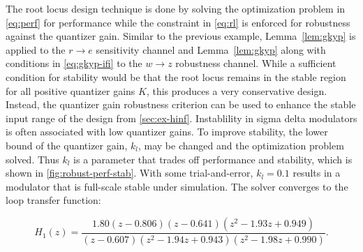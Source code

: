The root locus design technique is done by solving the optimization problem in \autoref{eq:perf} for performance while the constraint in \autoref{eq:rl} is enforced for robustness against the quantizer gain. Similar to the previous example, Lemma~\ref{lem:gkyp} is applied to the $r \rightarrow e$ sensitivity channel and Lemma~\ref{lem:gkyp} along with conditions in \autoref{eq:gkyp-ifi} to the $w \rightarrow z$ robustness channel. While a sufficient condition for stability would be that the root locus remains in the stable region for all positive quantizer gains $K$, this produces a very conservative design. Instead, the quantizer gain robustness criterion can be used to enhance the stable input range of the design from \autoref{sec:ex-hinf}. Instablility in sigma delta modulators is often associated with low quantizer gains. To improve stability, the lower bound of the quantizer gain, $k_l$, may be changed and the optimization problem solved. Thus $k_l$ is a parameter that trades off performance and stability, which is shown in \autoref{fig:robust-perf-stab}. With some trial-and-error, $k_l=0.1$ results in a modulator that is full-scale stable under simulation. The solver converges to the loop transfer function:

\begin{equation*}
	H_1(z) = \frac{1.80\left(z - 0.806\right)\left(z - 0.641\right)\left(z^2 - 1.93z + 0.949\right)}{\left(z - 0.607\right)\left(z^2 - 1.94z + 0.943\right)\left(z^2 - 1.98z + 0.990\right)}.
\end{equation*}

